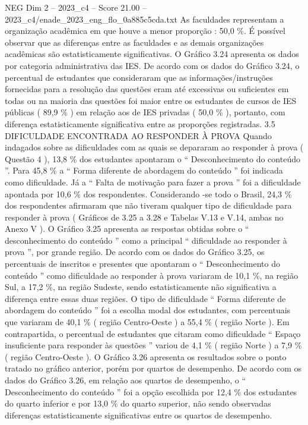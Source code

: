 \begin{textsample}{NEG Dim 2 – 2023\_c4 – Score 21.00 – 2023\_c4/enade\_2023\_eng\_flo\_0a885c5cda.txt}
As faculdades representam a organização acadêmica em que houve a menor proporção : 50,0 \%.
É possível observar que as diferenças entre as faculdades e as demais organizações acadêmicas são estatisticamente significativas.
O Gráfico 3.24 apresenta os dados por categoria administrativa das IES.
De acordo com os dados do Gráfico 3.24, o percentual de estudantes que consideraram que as informações/instruções fornecidas para a resolução das questões eram até excessivas ou suficientes em todas ou na maioria das questões foi maior entre os estudantes de cursos de IES públicas ( 89,9 \% ) em relação aos de IES privadas ( 50,0 \% ), portanto, com diferença estatisticamente significativa entre as proporções registradas. 3.5 DIFICULDADE ENCONTRADA AO RESPONDER À PROVA Quando indagados sobre as dificuldades com as quais se depararam ao responder à prova ( Questão 4 ), 13,8 \% dos estudantes apontaram o “ Desconhecimento do conteúdo ”.
Para 45,8 \% a “ Forma diferente de abordagem do conteúdo ” foi indicada como dificuldade.
Já a “ Falta de motivação para fazer a prova ” foi a dificuldade apontada por 10,6 \% dos respondentes.
Considerando -se todo o Brasil, 24,3 \% dos respondentes afirmaram que não tiveram qualquer tipo de dificuldade para responder à prova ( Gráficos de 3.25 a 3.28 e Tabelas V.13 e V.14, ambas no Anexo V ).
O Gráfico 3.25 apresenta as respostas obtidas sobre o “ desconhecimento do conteúdo ” como a principal “ dificuldade ao responder à prova ”, por grande região.
De acordo com os dados do Gráfico 3.25, os percentuais de inscritos e presentes que apontaram o “ Desconhecimento do conteúdo ” como dificuldade ao responder à prova variaram de 10,1 \%, na região Sul, a 17,2 \%, na região Sudeste, sendo estatisticamente não significativa a diferença entre essas duas regiões.
O tipo de dificuldade “ Forma diferente de abordagem do conteúdo ” foi a escolha modal dos estudantes, com percentuais que variaram de 40,1 \% ( região Centro-Oeste ) a 55,4 \% ( região Norte ).
Em contrapartida, o percentual de estudantes que citaram como dificuldade “ Espaço insuficiente para responder às questões ” variou de 4,1 \% ( região Norte ) a 7,9 \% ( região Centro-Oeste ).
O Gráfico 3.26 apresenta os resultados sobre o ponto tratado no gráfico anterior, porém por quartos de desempenho.
De acordo com os dados do Gráfico 3.26, em relação aos quartos de desempenho, o “ Desconhecimento do conteúdo ” foi a opção escolhida por 12,4 \% dos estudantes do quarto inferior e por 13,0 \% do quarto superior, não sendo observadas diferenças estatisticamente significativas entre os quartos de desempenho.

\end{textsample}
